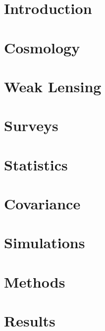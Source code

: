 \documentclass[11pt,a4paper]{ipmu}
\begin{document}
\makethesistitle

%     

\tableofcontents  %
\listoffigures    %
\listoftables     %

\chapter{Introduction}


\chapter{Cosmology}


\chapter{Weak Lensing}


\chapter{Surveys}


\chapter{Statistics}


\chapter{Covariance}


\chapter{Simulations}


\chapter{Methods}


\chapter{Results}

\end{document}
